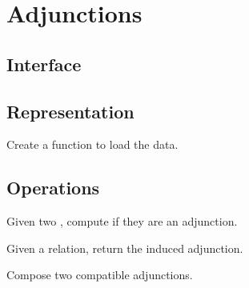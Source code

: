 \section{Adjunctions}

\subsection*{Interface}

\subsection*{Representation}



\begin{codeexercise}
    Create a function to load the data.

\end{codeexercise}

\subsection{Operations}
\begin{codeexercise}
    Given two , compute if they are an adjunction.

\end{codeexercise}

\begin{codeexercise}
    Given a relation, return the induced adjunction.
\end{codeexercise}

\begin{codeexercise}
    Compose two compatible adjunctions.
\end{codeexercise}
